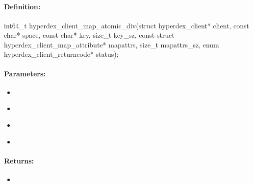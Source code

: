 \pagebreak
\subsection{}
\label{api:c:map_atomic_div}


\paragraph{Definition:}
\begin{ccode}
int64_t hyperdex_client_map_atomic_div(struct hyperdex_client* client,
        const char* space,
        const char* key, size_t key_sz,
        const struct hyperdex_client_map_attribute* mapattrs, size_t mapattrs_sz,
        enum hyperdex_client_returncode* status);
\end{ccode}

\paragraph{Parameters:}
\begin{itemize}[noitemsep]
\item {}\\

\item {}\\

\item {}\\

\item {}\\

\end{itemize}

\paragraph{Returns:}
\begin{itemize}[noitemsep]
\item {}\\

\end{itemize}

